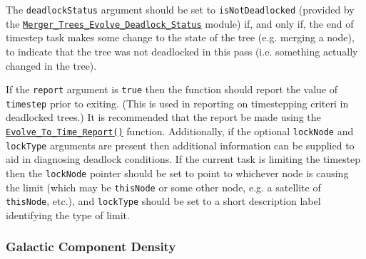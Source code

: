 The {\tt deadlockStatus} argument should be set to {\tt isNotDeadlocked} (provided by the \hyperlink{merger_trees.evolve.deadlock_options.F90:merger_trees_evolve_deadlock_status}{\tt Merger\_Trees\_Evolve\_Deadlock\_Status} module) if, and only if, the end of timestep task makes some change to the state of the tree (e.g. merging a node), to indicate that the tree was not deadlocked in this pass (i.e. something actually changed in the tree).

If the {\tt report} argument is {\tt true} then the function should report the value of {\tt timestep} prior to exiting. (This is used in reporting on timestepping criteri in deadlocked trees.) It is recommended that the report be made using the \hyperlink{merger_trees.evolve.timesteps.report.F90:evolve_to_time_reports:evolve_to_time_report}{\tt Evolve\_To\_Time\_Report()} function. Additionally, if the optional {\tt lockNode} and {\tt lockType} arguments are present then additional information can be supplied to aid in diagnosing deadlock conditions. If the current task is limiting the timestep then the {\tt lockNode} pointer should be set to point to whichever node is causing the limit (which may be {\tt thisNode} or some other node, e.g. a satellite of {\tt thisNode}, etc.), and {\tt lockType} should be set to a short description label identifying the type of limit.

\subsubsection{Galactic Component Density}\label{sec:GalacticComponentDensity}

